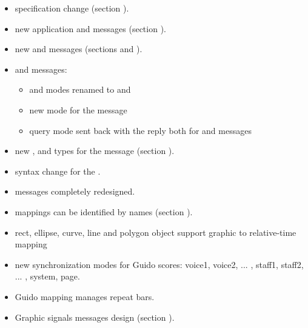 \begin{itemize}
\item {} specification change (section ).
\item new application  and   messages (section ).
\item new  and  messages  (sections  and  ).
\item {} and  messages:
\begin{itemize}
\item {} and  modes renamed to  and 
\item new  mode for the  message
\item query mode sent back with the reply both for  and   messages
\end{itemize}
\item new ,  and   types for the  message (section ).
\item {} syntax change for the .
\item {} messages completely redesigned.
\item mappings can be identified by names (section ).
\item rect, ellipse, curve, line and polygon object support graphic to relative-time mapping
\item new synchronization modes for Guido scores: voice1, voice2, ... , staff1, staff2, ... , system, page.
\item Guido mapping manages repeat bars.
\item Graphic signals messages design (section ).
\end{itemize}
